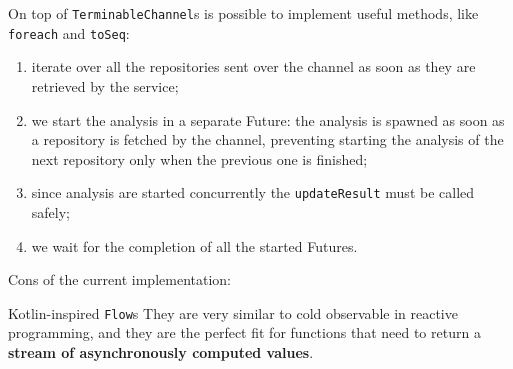 \documentclass[aspectratio=1610,xcolor=dvipsnames]{beamer}
\begin{document}

\begin{frame}
  
\end{frame}


\begin{frame}
  \small
  On top of \texttt{TerminableChannel}s is possible to implement useful methods, like \texttt{foreach} and \texttt{toSeq}:
  
\end{frame}


\begin{frame}
  
  \footnotesize
  \begin{enumerate}
      \item iterate over all the repositories sent over the channel as soon as they are retrieved by the service;
      \item we start the analysis in a separate Future: the analysis is spawned as soon as a repository is fetched by the channel, preventing starting the analysis of the next repository only when the previous one is finished;
      \item since analysis are started concurrently the \texttt{updateResult} must be called safely;
      \item we wait for the completion of all the started Futures.
  \end{enumerate}
\end{frame}


\begin{frame}
  Cons of the current implementation:
\end{frame}


\begin{frame}
  \begin{block}{Kotlin-inspired \texttt{Flow}s}
      They are very similar to cold observable in reactive programming, and they are the perfect fit for functions that need to return a \textbf{stream of asynchronously computed values}.
  \end{block}
  
\end{frame}
\end{document}
